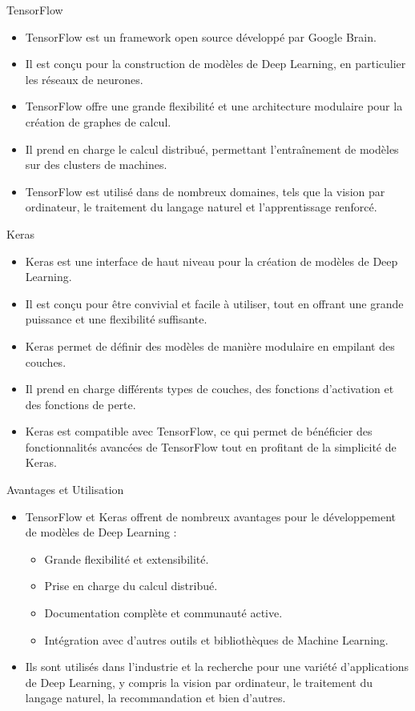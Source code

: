 \documentclass{beamer}
\begin{document}
\begin{frame}{TensorFlow}
	\begin{itemize}
		\item TensorFlow est un framework open source développé par Google Brain.
		\item Il est conçu pour la construction de modèles de Deep Learning, en particulier les réseaux de neurones.
		\item TensorFlow offre une grande flexibilité et une architecture modulaire pour la création de graphes de calcul.
		\item Il prend en charge le calcul distribué, permettant l'entraînement de modèles sur des clusters de machines.
		\item TensorFlow est utilisé dans de nombreux domaines, tels que la vision par ordinateur, le traitement du langage naturel et l'apprentissage renforcé.
	\end{itemize}
\end{frame}

\begin{frame}{Keras}
	\begin{itemize}
		\item Keras est une interface de haut niveau pour la création de modèles de Deep Learning.
		\item Il est conçu pour être convivial et facile à utiliser, tout en offrant une grande puissance et une flexibilité suffisante.
		\item Keras permet de définir des modèles de manière modulaire en empilant des couches.
		\item Il prend en charge différents types de couches, des fonctions d'activation et des fonctions de perte.
		\item Keras est compatible avec TensorFlow, ce qui permet de bénéficier des fonctionnalités avancées de TensorFlow tout en profitant de la simplicité de Keras.
	\end{itemize}
\end{frame}

\begin{frame}{Avantages et Utilisation}
	\begin{itemize}
		\item TensorFlow et Keras offrent de nombreux avantages pour le développement de modèles de Deep Learning :
		\begin{itemize}
			\item Grande flexibilité et extensibilité.
			\item Prise en charge du calcul distribué.
			\item Documentation complète et communauté active.
			\item Intégration avec d'autres outils et bibliothèques de Machine Learning.
		\end{itemize}
		\item Ils sont utilisés dans l'industrie et la recherche pour une variété d'applications de Deep Learning, y compris la vision par ordinateur, le traitement du langage naturel, la recommandation et bien d'autres.
	\end{itemize}
\end{frame}
\end{document}

